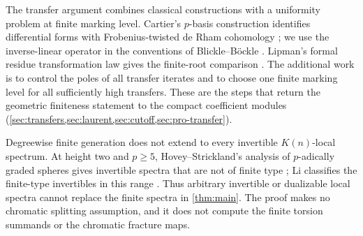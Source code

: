 The transfer argument combines classical constructions with a
uniformity problem at finite marking level. Cartier's $p$-basis
construction identifies differential forms with Frobenius-twisted
de Rham cohomology \citep[\S3, Theorem~1]{cartier1957}; we use the
inverse-linear operator in the conventions of Blickle--B\"ockle
\citep[Definition~2.1 and Example~2.23]{blickleBockle2011}.
Lipman's formal residue transformation law gives the finite-root
comparison \citep[Lemmas~(7.2)(b) and~(7.3)]{lipmanResidues1984}.
The additional work is to control the poles of all transfer iterates
and to choose one finite marking level for all sufficiently high
transfers. These are the steps that return the geometric finiteness
statement to the compact coefficient modules
(\cref{sec:transfers,sec:laurent,sec:cutoff,sec:pro-transfer}).

Degreewise finite generation does not extend to every invertible
$K(n)$-local spectrum.
At height two and $p\geq5$, Hovey--Strickland's analysis of
$p$-adically graded spheres gives invertible spectra that are not of
finite type \citep[Theorem~15.1]{hoveyStrickland1999}; Li classifies
the finite-type invertibles in this range
\citep[Theorem~4.22]{liFiniteType2021}.
Thus arbitrary invertible or dualizable local spectra cannot replace
the finite spectra in \cref{thm:main}.
The proof makes no chromatic splitting assumption, and it does not
compute the finite torsion summands or the chromatic fracture maps.
